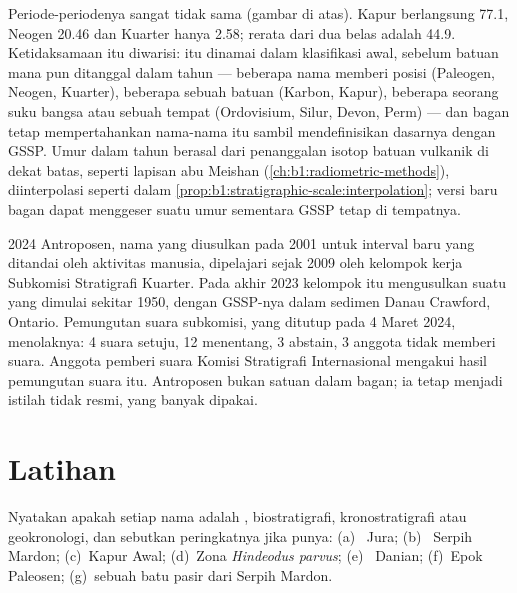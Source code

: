 
Periode-periodenya sangat tidak sama (gambar di atas). Kapur berlangsung \qty{77.1}{\Ma}, Neogen \qty{20.46}{\Ma} dan Kuarter hanya \qty{2.58}{\Ma}; rerata dari dua belas adalah \qty{44.9}{\Ma}. Ketidaksamaan itu diwarisi:  itu dinamai dalam klasifikasi awal, sebelum batuan mana pun ditanggal dalam tahun --- beberapa nama memberi posisi (Paleogen, Neogen, Kuarter), beberapa sebuah batuan (Karbon, Kapur), beberapa seorang suku bangsa atau sebuah tempat (Ordovisium, Silur, Devon, Perm) --- dan bagan tetap mempertahankan nama-nama itu sambil mendefinisikan dasarnya dengan GSSP. Umur dalam tahun berasal dari penanggalan isotop batuan vulkanik di dekat batas, seperti lapisan abu Meishan (\cref{ch:b1:radiometric-methods}), diinterpolasi seperti dalam \cref{prop:b1:stratigraphic-scale:interpolation}; versi baru bagan dapat menggeser suatu umur sementara GSSP tetap di tempatnya.

\begin{dated}{2024}
Antroposen, nama yang diusulkan pada 2001 untuk interval baru yang ditandai oleh aktivitas manusia, dipelajari sejak 2009 oleh kelompok kerja Subkomisi Stratigrafi Kuarter. Pada akhir 2023 kelompok itu mengusulkan suatu  yang dimulai sekitar 1950, dengan GSSP-nya dalam sedimen Danau Crawford, Ontario. Pemungutan suara subkomisi, yang ditutup pada 4 Maret 2024, menolaknya: 4 suara setuju, 12 menentang, 3 abstain, 3 anggota tidak memberi suara. Anggota pemberi suara Komisi Stratigrafi Internasional mengakui hasil pemungutan suara itu. Antroposen bukan satuan dalam bagan; ia tetap menjadi istilah tidak resmi, yang banyak dipakai.
\end{dated}

\section{Latihan}

\begin{exercise}[$\star$]\label{exo:b1:stratigraphic-scale:1}
Nyatakan apakah setiap nama adalah , biostratigrafi, kronostratigrafi atau geokronologi, dan sebutkan peringkatnya jika punya: (a)~ Jura; (b)~ Serpih Mardon; (c)~Kapur Awal; (d)~Zona \emph{Hindeodus parvus}; (e)~ Danian; (f)~Epok Paleosen; (g)~sebuah  batu pasir dari Serpih Mardon.
\end{exercise}


